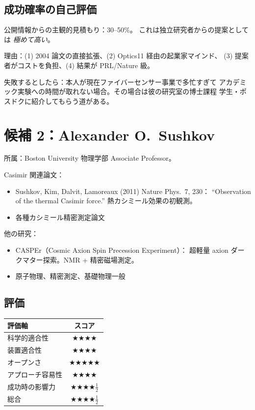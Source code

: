 \documentclass[11pt,a4paper]{article}
\def\textbf#1{#1}%
\begin{document}
\subsection{成功確率の自己評価}

公開情報からの主観的見積もり：\textbf{30--50\%}。
これは独立研究者からの提案としては \emph{極めて高い}。

理由：(1) 2004 論文の直接拡張、(2) Optics11 経由の起業家マインド、
(3) 提案者がコストを負担、(4) 結果が PRL/Nature 級。

\textbf{失敗するとしたら}：本人が現在ファイバーセンサー事業で多忙すぎて
アカデミック実験への時間が取れない場合。その場合は彼の研究室の博士課程
学生・ポスドクに紹介してもらう道がある。

\newpage

\section{候補 2：Alexander O.\ Sushkov}

\begin{candidatebox}
\textbf{所属}：Boston University 物理学部 Associate Professor。

\textbf{Casimir 関連論文}：
\begin{itemize}
\item \textbf{Sushkov, Kim, Dalvit, Lamoreaux (2011) Nature Phys.\ 7, 230}：
  ``Observation of the thermal Casimir force.''
  熱カシミール効果の初観測。
\item 各種カシミール精密測定論文
\end{itemize}

\textbf{他の研究}：
\begin{itemize}
\item \textbf{CASPEr（Cosmic Axion Spin Precession Experiment）}：
  超軽量 axion ダークマター探索。NMR + 精密磁場測定。
\item 原子物理、精密測定、基礎物理一般
\end{itemize}
\end{candidatebox}

\subsection{評価}

\begin{center}
\begin{tabular}{lc}
\toprule
評価軸 & スコア \\
\midrule
科学的適合性    & ★★★★ \\
装置適合性      & ★★★★ \\
オープンさ      & ★★★★★ \\
アプローチ容易性 & ★★★★ \\
成功時の影響力  & ★★★★$\frac{1}{2}$ \\
\midrule
\textbf{総合}   & \textbf{★★★★$\frac{1}{2}$} \\
\bottomrule
\end{tabular}
\end{center}
\end{document}
